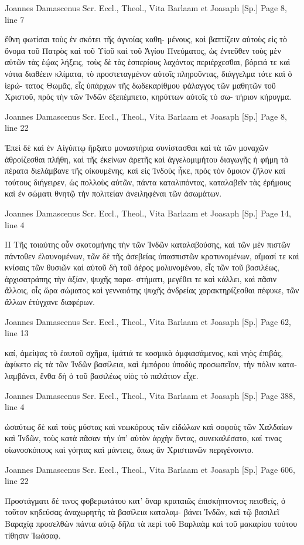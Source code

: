 \documentclass[12pt,letterpaper,twoside,final]{memoir}
\begin{document}
\begin{greek}
Joannes Damascenus Scr. Eccl., Theol., Vita Barlaam et Joasaph [Sp.] 
Page 8, line 7

ἔθνη φωτίσαι τοὺς ἐν σκότει τῆς ἀγνοίας καθη-
μένους, καὶ βαπτίζειν αὐτοὺς εἰς τὸ ὄνομα τοῦ 
Πατρὸς καὶ τοῦ Υἱοῦ καὶ τοῦ Ἁγίου Πνεύματος,   
ὡς ἐντεῦθεν τοὺς μὲν αὐτῶν τὰς ἑῴας λήξεις, τοὺς 
δὲ τὰς ἑσπερίους λαχόντας περιέρχεσθαι, βόρειά 
τε καὶ νότια διαθέειν κλίματα, τὸ προστεταγμένον 
αὐτοῖς πληροῦντας, διάγγελμα τότε καὶ ὁ ἱερώ-
τατος Θωμᾶς, εἷς ὑπάρχων τῆς δωδεκαρίθμου 
φάλαγγος τῶν μαθητῶν τοῦ Χριστοῦ, πρὸς τὴν 
τῶν Ἰνδῶν ἐξεπέμπετο, κηρύττων αὐτοῖς τὸ σω-
τήριον κήρυγμα. 



Joannes Damascenus Scr. Eccl., Theol., Vita Barlaam et Joasaph [Sp.] 
Page 8, line 22

Ἐπεὶ δὲ καὶ ἐν Αἰγύπτῳ ἤρξατο μοναστήρια 
συνίστασθαι καὶ τὰ τῶν μοναχῶν ἀθροίζεσθαι 
πλήθη, καὶ τῆς ἐκείνων ἀρετῆς καὶ ἀγγελομιμήτου 
διαγωγῆς ἡ φήμη τὰ πέρατα διελάμβανε τῆς 
οἰκουμένης, καὶ εἰς Ἰνδοὺς ἧκε, πρὸς τὸν ὅμοιον 
ζῆλον καὶ τούτους διήγειρεν, ὡς πολλοὺς αὐτῶν, 
πάντα καταλιπόντας, καταλαβεῖν τὰς ἐρήμους 
καὶ ἐν σώματι θνητῷ τὴν πολιτείαν ἀνειληφέναι 
τῶν ἀσωμάτων. 



Joannes Damascenus Scr. Eccl., Theol., Vita Barlaam et Joasaph [Sp.] 
Page 14, line 4

II 
 Τῆς τοιαύτης οὖν σκοτομήνης τὴν τῶν Ἰνδῶν 
καταλαβούσης, καὶ τῶν μὲν πιστῶν πάντοθεν 
ἐλαυνομένων, τῶν δὲ τῆς ἀσεβείας ὑπασπιστῶν 
κρατυνομένων, αἵμασί τε καὶ κνίσαις τῶν θυσιῶν 
καὶ αὐτοῦ δὴ τοῦ ἀέρος μολυνομένου, εἷς τῶν τοῦ 
βασιλέως, ἀρχισατράπης τὴν ἀξίαν, ψυχῆς παρα-
στήματι, μεγέθει τε καὶ κάλλει, καὶ πᾶσιν ἄλλοις, 
οἷς ὥρα σώματος καὶ γενναιότης ψυχῆς ἀνδρείας 
χαρακτηρίζεσθαι πέφυκε, τῶν ἄλλων ἐτύγχανε 
διαφέρων. 



Joannes Damascenus Scr. Eccl., Theol., Vita Barlaam et Joasaph [Sp.] 
Page 62, line 13

                 καί, ἀμείψας τὸ ἑαυτοῦ σχῆμα, 
ἱμάτιά τε κοσμικὰ ἀμφιασάμενος, καὶ νηὸς ἐπιβάς, 
ἀφίκετο εἰς τὰ τῶν Ἰνδῶν βασίλεια, καὶ ἐμπόρου 
ὑποδὺς προσωπεῖον, τὴν πόλιν καταλαμβάνει, 
ἔνθα δὴ ὁ τοῦ βασιλέως υἱὸς τὸ παλάτιον εἶχε. 



Joannes Damascenus Scr. Eccl., Theol., Vita Barlaam et Joasaph [Sp.] 
Page 388, line 4

                             ὡσαύτως δὲ καὶ τοὺς 
μύστας καὶ νεωκόρους τῶν εἰδώλων καὶ σοφοὺς 
τῶν Χαλδαίων καὶ Ἰνδῶν, τοὺς κατὰ πᾶσαν τὴν 
ὑπ' αὐτὸν ἀρχὴν ὄντας, συνεκαλέσατο, καί τινας 
οἰωνοσκόπους καὶ γόητας καὶ μάντεις, ὅπως ἂν 
Χριστιανῶν περιγένοιντο. 



Joannes Damascenus Scr. Eccl., Theol., Vita Barlaam et Joasaph [Sp.] 
Page 606, line 22

Προστάγματι δέ τινος φοβερωτάτου κατ' ὄναρ 
κραταιῶς ἐπισκήπτοντος πεισθείς, ὁ τοῦτον 
κηδεύσας ἀναχωρητὴς τὰ βασίλεια καταλαμ-
βάνει Ἰνδῶν, καὶ τῷ βασιλεῖ Βαραχίᾳ προσελθὼν 
πάντα αὐτῷ δῆλα τὰ περὶ τοῦ Βαρλαὰμ καὶ τοῦ 
μακαρίου τούτου τίθησιν Ἰωάσαφ. 

\end{greek}
\end{document}
